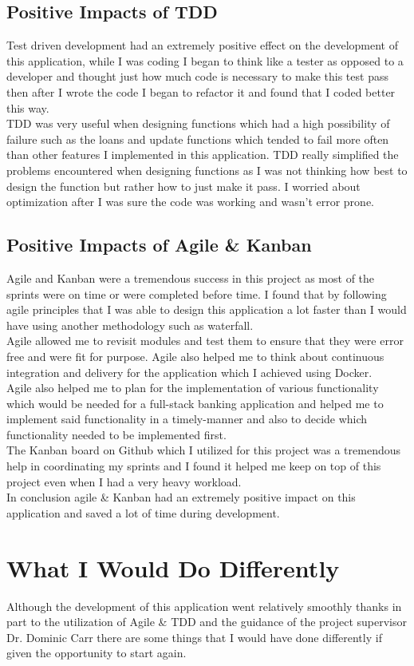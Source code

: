 \subsection{Positive Impacts of TDD}
Test driven development had an extremely positive effect on the development of this application, while I was coding I began to think like a tester as opposed to a developer and thought just how much code is necessary to make this test pass then after I wrote the code I began to refactor it and found that I coded better this way.
\\
TDD was very useful when designing functions which had a high possibility of failure such as the loans and update functions which tended to fail more often than other features I implemented in this application.  TDD really simplified the problems encountered when designing functions as I was not thinking how best to design the function but rather how to just make it pass.  I worried about optimization after I was sure the code was working and wasn't error prone.
\subsection{Positive Impacts of Agile \& Kanban}
Agile and Kanban were a tremendous success in this project as most of the sprints were on time or were completed before time.  I found that by following agile principles that I was able to design this application a lot faster than I would have using another methodology such as waterfall.
\\
Agile allowed me to revisit modules and test them to ensure that they were error free and were fit for purpose.  Agile also helped me to think about continuous integration and delivery for the application which I achieved using Docker.
\\
Agile also helped me to plan for the implementation of various functionality which would be needed for a full-stack banking application and helped me to implement said functionality in a timely-manner and also to decide which functionality needed to be implemented first.
\\
The Kanban board on Github which I utilized for this project was a tremendous help in coordinating my sprints and I found it helped me keep on top of this project even when I had a very heavy workload.
\\
In conclusion agile \& Kanban had an extremely positive impact on this application and saved a lot of time during development.
\section{What I Would Do Differently}
Although the development of this application went relatively smoothly thanks in part to the utilization of Agile \& TDD and the guidance of the project supervisor Dr. Dominic Carr there are some things that I would have done differently if given the opportunity to start again.
